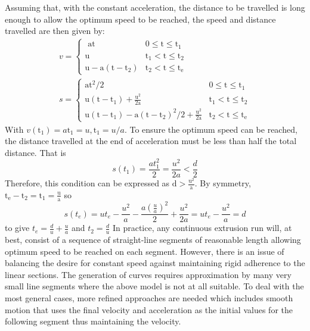 \documentclass{UoNMCHA}
\numberwithin{equation}{section}
\begin{document}
Assuming that, with the constant acceleration, the distance to be travelled is long enough to allow the
optimum speed to be reached, the speed and distance travelled are then given by:
$$
\begin{array}{c}
v=\left\{\begin{array}{cc}
\text { at } & 0 \leq \mathrm{t} \leq \mathrm{t}_{1} \\
\mathrm{u} & \mathrm{t}_{1}<\mathrm{t} \leq \mathrm{t}_{2} \\
\mathrm{u}-\mathrm{a}\left(\mathrm{t}-\mathrm{t}_{2}\right) & \mathrm{t}_{2}<\mathrm{t} \leq \mathrm{t}_{\mathrm{e}}
\end{array}\right. \\
s=\left\{\begin{array}{cc}
\mathrm{at}^{2} / 2 & 0 \leq \mathrm{t} \leq \mathrm{t}_{1} \\
\mathrm{u}\left(\mathrm{t}-\mathrm{t}_{1}\right)+\frac{\mathrm{u}^{2}}{2 \mathrm{a}} & \mathrm{t}_{1}<\mathrm{t} \leq \mathrm{t}_{2} \\
\mathrm{u}\left(\mathrm{t}-\mathrm{t}_{1}\right)-\mathrm{a}\left(\mathrm{t}-\mathrm{t}_{2}\right)^{2} / 2+\frac{\mathrm{u}^{2}}{2 \mathrm{a}} & \mathrm{t}_{2}<\mathrm{t} \leq \mathrm{t}_{\mathrm{e}}
\end{array}\right.
\end{array}
$$
With $v\left(\mathrm{t}_{1}\right)=a \mathrm{t}_{1}=u, \mathrm{t}_{1}=u / a .$ To ensure the optimum speed can be reached, the distance travelled
at the end of acceleration must be less than half the total distance. That is
$$
s\left(t_{1}\right)=\frac{a t_{1}^{2}}{2}=\frac{u^{2}}{2 a}<\frac{d}{2}
$$
Therefore, this condition can be expressed as $\mathrm{d}>\frac{\mathrm{u}^{2}}{\mathrm{a}} .$ By symmetry, $\mathrm{t}_{\mathrm{e}}-\mathrm{t}_{2}=\mathrm{t}_{1}=\frac{\mathrm{u}}{\mathrm{a}}$ so
$$
s\left(t_{e}\right)=u t_{e}-\frac{u^{2}}{a}-\frac{a\left(\frac{u}{a}\right)^{2}}{2}+\frac{u^{2}}{2 a}=u t_{e}-\frac{u^{2}}{a}=d
$$
to give $t_{e}=\frac{d}{u}+\frac{u}{a}$ and $t_{2}=\frac{d}{u}$
In practice, any continuous extrusion run will, at best, consist of a sequence of straight-line segments
of reasonable length allowing optimum speed to be reached on each segment. However, there is an
issue of balancing the desire for constant speed against maintaining rigid adherence to the linear
sections. The generation of curves requires approximation by many very small line segments where the
above model is not at all suitable. To deal with the most general cases, more refined approaches are
needed which includes smooth motion that uses the final velocity and acceleration as the initial values
for the following segment thus maintaining the velocity.
\end{document}

